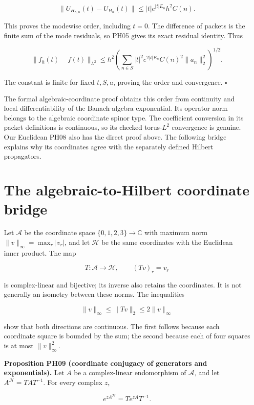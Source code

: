 \[
\|U_{H_{h,n}}(t)-U_{H_n}(t)\|
\le |t|e^{|t|E_n}h^2C(n).
\]

This proves the modewise order, including \(t=0\). The difference of
packets is the finite sum of the mode residuals, so PH05 gives its exact
residual identity. Thus

\[
\|f_h(t)-f(t)\|_{L^2}
\le h^2\left(
\sum_{n\in S}|t|^2e^{2|t|E_n}C(n)^2\|a_n\|_2^2
\right)^{1/2}.
\]

The constant is finite for fixed \(t,S,a\), proving the order and
convergence. \(\square\)

The formal algebraic-coordinate proof obtains this order from continuity and local
differentiability of the Banach-algebra exponential. Its operator norm
belongs to the algebraic coordinate spinor type. The coefficient
conversion in its packet definitions is continuous, so its checked
torus-\(L^2\) convergence is genuine. Our Euclidean PH08 also has the
direct proof above. The following bridge explains why its coordinates
agree with the separately defined Hilbert propagators.

\hypertarget{the-algebraic-to-hilbert-coordinate-bridge}{%
\section{The algebraic-to-Hilbert coordinate
bridge}\label{the-algebraic-to-hilbert-coordinate-bridge}}

Let \(\mathcal A\) be the coordinate space \(\{0,1,2,3\}\to\mathbb C\)
with maximum norm \(\|v\|_\infty=\max_r|v_r|\), and let \(\mathcal H\)
be the same coordinates with the Euclidean inner product. The map

\[
T:\mathcal A\longrightarrow\mathcal H,\qquad (Tv)_r=v_r
\]

is complex-linear and bijective; its inverse also retains the
coordinates. It is not generally an isometry between these norms. The
inequalities

\[
\|v\|_\infty\le\|Tv\|_2\le2\|v\|_\infty
\]

show that both directions are continuous. The first follows because each
coordinate square is bounded by the sum; the second because each of four
squares is at most \(\|v\|_\infty^2\).

\textbf{Proposition PH09 (coordinate conjugacy of generators and
exponentials).} Let \(A\) be a complex-linear endomorphism of
\(\mathcal A\), and let \(A^{\mathcal H}=TAT^{-1}\). For every complex
\(z\),

\[
e^{zA^{\mathcal H}}=Te^{zA}T^{-1}.
\]

